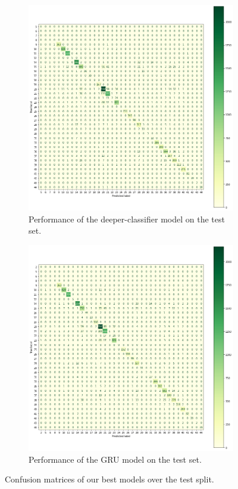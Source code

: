 \documentclass[letterpaper,10.8pt]{article}
\begin{document}
\begin{figure}
    \begin{subfigure}[t]{0.485\textwidth}
        \centering
        \includegraphics[width=\textwidth]{imgs/deeper_classifier.png}
        \caption{Performance of the deeper-classifier model on the test set.}
        \label{fig:performance_deeper}
    \end{subfigure}
    \hfill
    \begin{subfigure}[t]{0.485\textwidth}
        \centering
        \includegraphics[width=\textwidth]{imgs/gru.png}
        \caption{Performance of the GRU model on the test set.}
        \label{fig:performance_gru}
    \end{subfigure}
    \caption{Confusion matrices of our best models over the test split.}
    \label{fig:confusion_matrices}
\end{figure}
\end{document}
